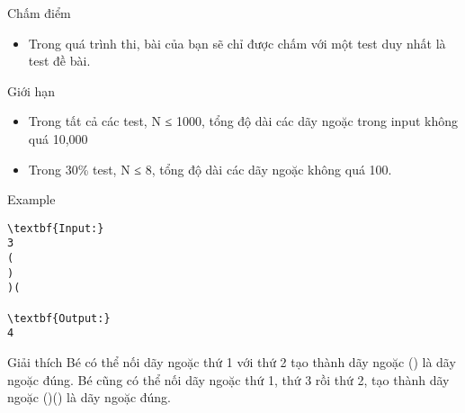 Chấm điểm
\begin{itemize}
	\item     Trong quá trình thi, bài của bạn sẽ chỉ được chấm với một test duy nhất là test đề bài.   
\end{itemize}
Giới hạn
\begin{itemize}
	\item     Trong tất cả các test, N ≤ 1000, tổng độ dài các dãy ngoặc trong input không quá 10,000   
	\item     Trong 30\% test, N ≤ 8, tổng độ dài các dãy ngoặc không quá 100.   
\end{itemize}
Example
\begin{verbatim}
\textbf{Input:}
3
(
)
)(

\textbf{Output:}
4
\end{verbatim}
Giải thích
Bé có thể nối dãy ngoặc thứ 1 với thứ 2 tạo thành dãy ngoặc () là dãy ngoặc đúng. Bé cũng có thể nối dãy ngoặc thứ 1, thứ 3 rồi thứ 2, tạo thành dãy ngoặc ()() là dãy ngoặc đúng.